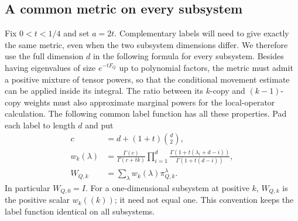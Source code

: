 \subsection{A common metric on every subsystem}

Fix $0<t<1/4$ and set $a=2t$.
Complementary labels will need to give exactly the same metric, even
when the two subsystem dimensions differ.  We therefore use the full
dimension $d$ in the following formula for every subsystem.  Besides
having eigenvalues of size $e^{-tF_Q}$ up to polynomial factors, the
metric must admit a positive mixture of tensor powers, so that the
conditional movement estimate can be applied inside its integral.
The ratio between its $k$-copy and $(k-1)$-copy weights must also
approximate marginal powers for the local-operator calculation.
The following common label function has all these properties.
Pad each label to length $d$ and put
\begin{equation}\label{replicas:w-definition}
 \begin{split}
 c&=d+(1+t)\binom{d}{2},\\
 w_k(\lambda)&=\frac{\Gamma(c)}{\Gamma(c+tk)}
    \prod_{i=1}^d
       \frac{\Gamma(1+t(\lambda_i+d-i))}
            {\Gamma(1+t(d-i))},\\
 W_{Q,k}&=\sum_\lambda w_k(\lambda)\pi_{Q,k}^{\lambda}.
 \end{split}
\end{equation}
In particular $W_{Q,0}=I$.  For a one-dimensional subsystem at
positive $k$, $W_{Q,k}$ is the positive scalar $w_k((k))$; it need
not equal one.  This convention keeps the label function identical
on all subsystems.

